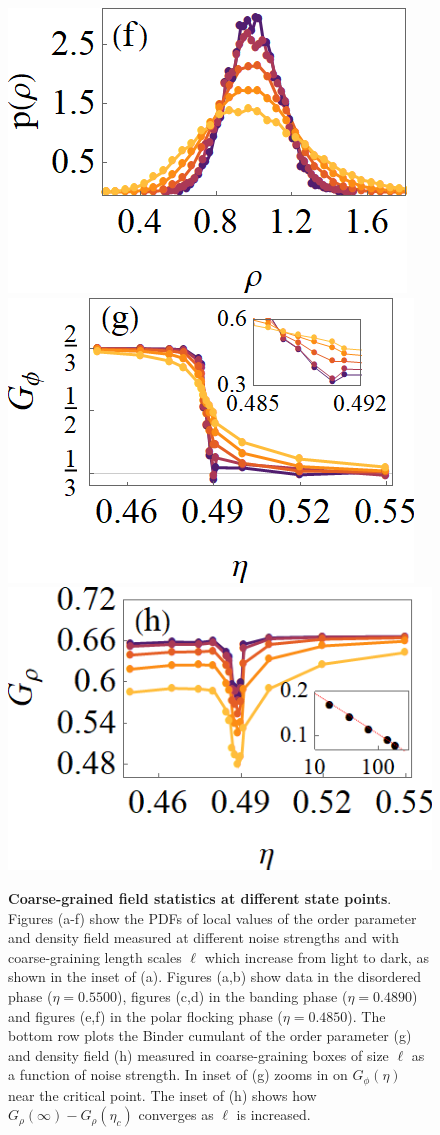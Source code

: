 \documentclass[twoside,twocolumn,9pt]{article}
\begin{document}
\begin{figure}[ht]
	\includegraphics[width=0.50\columnwidth]{PDF_phi_dt=0.005_e=0.4850.png}\vspace{4mm}
	\includegraphics[width=0.47\columnwidth]{G_phi_dt=0.005.png}
	\includegraphics[width=0.51\columnwidth]{G_rho_dt=0.005.png}
	\caption{\textbf{Coarse-grained field statistics at different state points}.
        Figures (a-f) show the PDFs of local values of the order parameter and density field measured at different noise strengths and with coarse-graining length scales $\ell$ which increase from light to dark, as shown in the inset of (a).
        Figures (a,b) show data in the disordered phase ($\eta=0.5500$), figures (c,d) in the banding phase ($\eta=0.4890$) and figures (e,f) in the polar flocking phase ($\eta=0.4850$).
		The bottom row plots the Binder cumulant of the order parameter (g) and density field (h) measured in coarse-graining boxes of size $\ell$ as a function of noise strength. In inset of (g) zooms in on $G_{\phi}(\eta)$ near the critical point. The inset of (h) shows how $G_{\rho}(\infty)-G_{\rho}(\eta_c)$ converges as $\ell$ is increased.
	}
	\label{fig:CoarseGrainedFieldStatistics_Continuous}
\end{figure}
\end{document}
